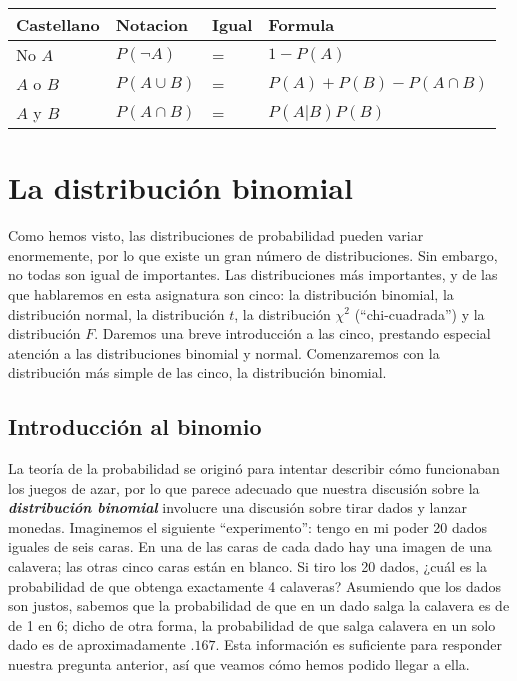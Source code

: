 \documentclass[spanish,]{book}
\begin{document}
\begin{longtable}[]{@{}llll@{}}
\toprule
Castellano & Notacion & Igual & Formula\tabularnewline
\midrule
\endhead
No \(A\) & \(P(\neg A)\) & = & \(1-P(A)\)\tabularnewline
\(A\) o \(B\) & \(P(A \cup B)\) & = &
\(P(A) + P(B) - P(A \cap B)\)\tabularnewline
\(A\) y \(B\) & \(P(A \cap B)\) & = &
\(P(A \vert B) P(B)\)\tabularnewline
\bottomrule
\end{longtable}

\section{La distribución binomial}\label{binomial}

Como hemos visto, las distribuciones de probabilidad pueden variar
enormemente, por lo que existe un gran número de distribuciones. Sin
embargo, no todas son igual de importantes. Las distribuciones más
importantes, y de las que hablaremos en esta asignatura son cinco: la
distribución binomial, la distribución normal, la distribución \(t\), la
distribución \(\chi^2\) (``chi-cuadrada'') y la distribución \(F\).
Daremos una breve introducción a las cinco, prestando especial atención
a las distribuciones binomial y normal. Comenzaremos con la distribución
más simple de las cinco, la distribución binomial.

\subsection{Introducción al binomio}\label{introduccion-al-binomio}

La teoría de la probabilidad se originó para intentar describir cómo
funcionaban los juegos de azar, por lo que parece adecuado que nuestra
discusión sobre la \textbf{\emph{distribución binomial}} involucre una
discusión sobre tirar dados y lanzar monedas. Imaginemos el siguiente
``experimento'': tengo en mi poder 20 dados iguales de seis caras. En
una de las caras de cada dado hay una imagen de una calavera; las otras
cinco caras están en blanco. Si tiro los 20 dados, ¿cuál es la
probabilidad de que obtenga exactamente 4 calaveras? Asumiendo que los
dados son justos, sabemos que la probabilidad de que en un dado salga la
calavera es de de 1 en 6; dicho de otra forma, la probabilidad de que
salga calavera en un solo dado es de aproximadamente \(.167\). Esta
información es suficiente para responder nuestra pregunta anterior, así
que veamos cómo hemos podido llegar a ella.
\end{document}
